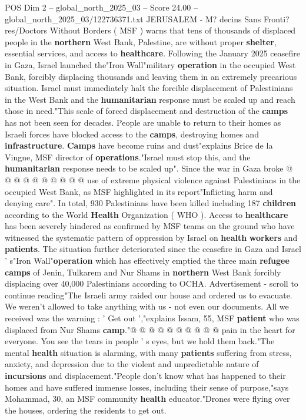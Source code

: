 \begin{textsample}{POS Dim 2 – global\_north\_2025\_03 – Score 24.00 – global\_north\_2025\_03/122736371.txt}  \label{ex:f2_pos_409}
JERUSALEM - M? decins Sans Fronti? res/Doctors Without Borders ( MSF ) warns that tens of thousands of displaced people in the \textbf{northern} West Bank, Palestine, are without proper \textbf{shelter}, essential services, and access to \textbf{healthcare}.
Following the January 2025 ceasefire in Gaza, Israel launched the"Iron Wall"military \textbf{operation} in the occupied West Bank, forcibly displacing thousands and leaving them in an extremely precarious situation.
Israel must immediately halt the forcible displacement of Palestinians in the West Bank and the \textbf{humanitarian} response must be scaled up and reach those in need."This scale of forced displacement and destruction of the \textbf{camps} has not been seen for decades.
People are unable to return to their homes as Israeli forces have blocked access to the \textbf{camps}, destroying homes and \textbf{infrastructure}. \textbf{Camps} have become ruins and dust"explains Brice de la Vingne, MSF director of \textbf{operations}."Israel must stop this, and the \textbf{humanitarian} response needs to be scaled up".
Since the war in Gaza broke @ @ @ @ @ @ @ @ @ @ use of extreme physical violence against Palestinians in the occupied West Bank, as MSF highlighted in its report"Inflicting harm and denying care".
In total, 930 Palestinians have been killed including 187 \textbf{children} according to the World \textbf{Health} Organization ( WHO ).
Access to \textbf{healthcare} has been severely hindered as confirmed by MSF teams on the ground who have witnessed the systematic pattern of oppression by Israel on \textbf{health} \textbf{workers} and \textbf{patients}.
The situation further deteriorated since the ceasefire in Gaza and Israel ' s"Iron Wall"\textbf{operation} which has effectively emptied the three main \textbf{refugee} \textbf{camps} of Jenin, Tulkarem and Nur Shams in \textbf{northern} West Bank forcibly displacing over 40,000 Palestinians according to OCHA.
Advertisement - scroll to continue reading"The Israeli army raided our house and ordered us to evacuate.
We weren't allowed to take anything with us - not even our documents.
All we received was the warning : ' Get out ',"explains Issam, 55, MSF \textbf{patient} who was displaced from Nur Shams \textbf{camp}."@ @ @ @ @ @ @ @ @ @ pain in the heart for everyone.
You see the tears in people ' s eyes, but we hold them back."The mental \textbf{health} situation is alarming, with many \textbf{patients} suffering from stress, anxiety, and depression due to the violent and unpredictable nature of \textbf{incursions} and displacement."People don't know what has happened to their homes and have suffered immense losses, including their sense of purpose,"says Mohammad, 30, an MSF community \textbf{health} educator."Drones were flying over the houses, ordering the residents to get out.

\end{textsample}
